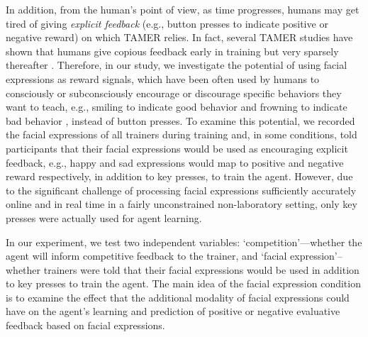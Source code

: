 In addition, from the human's point of view, as time progresses, humans may get tired of giving \emph{explicit feedback} (e.g., button presses to indicate positive or negative reward) on which TAMER relies. In fact, several TAMER studies have shown that humans give copious feedback early in training but very sparsely thereafter \cite{knox2012humans,li2013using}. Therefore, in our study, we investigate the potential of using facial expressions as reward signals, which have been often used by humans to consciously or subconsciously encourage or discourage specific behaviors they want to teach, e.g., smiling to indicate good behavior and frowning to indicate bad behavior \cite{vail1994emotion}, instead of button presses.
To examine this potential, we recorded the facial expressions of all trainers during training and, in some conditions, told participants that their facial expressions 
would be used as encouraging explicit feedback, e.g., happy and sad expressions would map to positive and negative reward respectively, 
in addition to key presses, to train the agent. However, due to the significant challenge of processing facial expressions sufficiently accurately online and in real time in a fairly unconstrained non-laboratory setting, only key presses were actually used for agent learning. 

In our experiment, we test two independent variables: `competition'---whether the agent will inform competitive feedback to the trainer, and `facial expression'\---whether trainers were told that their facial expressions would be used in addition to key presses to train the agent. The main idea of the facial expression condition is to examine the effect that the additional modality of facial expressions could have on the agent's learning and prediction of positive or negative evaluative feedback based on facial expressions. %

